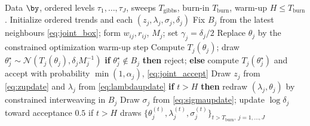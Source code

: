 \begin{algorithm}[!htbp]
\caption{Joint Bayesian-PMALA for ordered quantile levels}
\label{alg:joint_pmala}
\begin{algorithmic}[1]
\Require Data $\by$, ordered levels $\tau_1,\ldots,\tau_J$, sweeps $T_{\mathrm{gibbs}}$, burn-in $T_{\mathrm{burn}}$, warm-up $H\leq T_{\mathrm{burn}}$.
\State Initialize ordered trends and each $(z_j,\lambda_j,\sigma_j,\delta_j)$ 
        \State Fix $B_j$ from the latest neighbours \eqref{eq:joint_box}; form $w_{ij}, r_{ij}$, $M_j$; set $\gamma_j = \delta_j/2$
            \State Replace $\theta_j$ by the constrained optimization warm-up step
        \Else
            \State Compute $T_j(\theta_j)$; draw $\theta_j^\star \sim \mathcal N(T_j(\theta_j), \delta_jM_j^{-1})$ 
            \State \textbf{if} $\theta_j^\star\notin B_j$ \textbf{then} reject; \textbf{else} compute $T_j(\theta_j^\star)$ and accept with probability $\min(1,\alpha_j)$, \eqref{eq:joint_accept}
        \EndIf
        \State Draw $z_j$ from \eqref{eq:zupdate} and $\lambda_j$ from \eqref{eq:lambdaupdate}
        \State \textbf{if} $t>H$ \textbf{then} redraw $(\lambda_j,\theta_j)$ by constrained interweaving in $B_j$
        \State Draw $\sigma_j$ from \eqref{eq:sigmaupdate}; update $\log\delta_j$ toward acceptance $0.5$ if $t > H$
    \EndFor
\EndFor
\State \Return draws $\{\theta_j^{(t)}, \lambda_j^{(t)}, \sigma_j^{(t)}\}_{t > T_{\mathrm{burn}},\ j = 1,\ldots,J}$
\end{algorithmic}
\end{algorithm}
